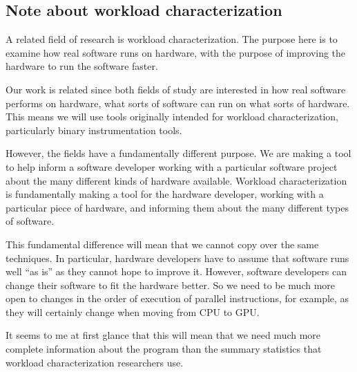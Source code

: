 \documentclass[12pt,twoside]{reedthesis}
\begin{document}




	\subsection{Note about workload characterization}

		A related field of research is workload characterization. The purpose here is to examine how real software runs on hardware, with the purpose of improving the hardware to run the software faster.

		Our work is related since both fields of study are interested in how real software performs on hardware, what sorts of software can run on what sorts of hardware. This means we will use tools originally intended for workload characterization, particularly binary instrumentation tools.

		However, the fields have a fundamentally different purpose. We are making a tool to help inform a software developer working with a particular software project about the many different kinds of hardware available. Workload characterization is fundamentally making a tool for the hardware developer, working with a particular piece of hardware, and informing them about the many different types of software.

		This fundamental difference will mean that we cannot copy over the same techniques. In particular, hardware developers have to assume that software runs well “as is” as they cannot hope to improve it. However, software developers can change their software to fit the hardware better. So we need to be much more open to changes in the order of execution of parallel instructions, for example, as they will certainly change when moving from CPU to GPU.

		It seems to me at first glance that this will mean that we need much more complete information about the program than the summary statistics that workload characterization researchers use.
\end{document}
